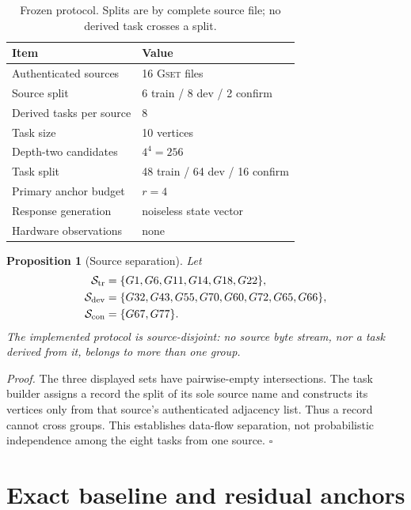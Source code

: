\documentclass[10pt,letterpaper,twoside]{article}
\newtheorem{proposition}{Proposition}
\newcommand{\dataset}{\textsc{Gset}}
\begin{document}
\begin{table}[t]
\caption{Frozen protocol.  Splits are by complete source file; no derived
task crosses a split.}
\label{tab:protocol}
\begin{ruledtabular}
\begin{tabular}{@{}p{}p{}@{}}
Item & Value\\
\hline
Authenticated sources & 16 \dataset{} files\\
Source split & 6 train / 8 dev / 2 confirm\\
Derived tasks per source & 8\\
Task size & 10 vertices\\
Depth-two candidates & $4^4=256$\\
Task split & 48 train / 64 dev / 16 confirm\\
Primary anchor budget & $r=4$\\
Response generation & noiseless state vector\\
Hardware observations & none\\
\end{tabular}
\end{ruledtabular}
\end{table}

\begin{proposition}[Source separation]
Let
\begin{align}
\mathcal S_{\rm tr}&=\{G1,G6,G11,G14,G18,G22\},\\
\mathcal S_{\rm dev}&=\{G32,G43,G55,G70,G60,G72,G65,G66\},\\
\mathcal S_{\rm con}&=\{G67,G77\}.
\end{align}
The implemented protocol is source-disjoint: no source byte stream, nor a
task derived from it, belongs to more than one group.
\end{proposition}

\noindent\textit{Proof.}
The three displayed sets have pairwise-empty intersections.  The task builder
assigns a record the split of its sole source name and constructs its vertices
only from that source's authenticated adjacency list.  Thus a record cannot
cross groups.  This establishes data-flow separation, not probabilistic
independence among the eight tasks from one source. \hfill$\square$

\section{Exact baseline and residual anchors}
\end{document}
